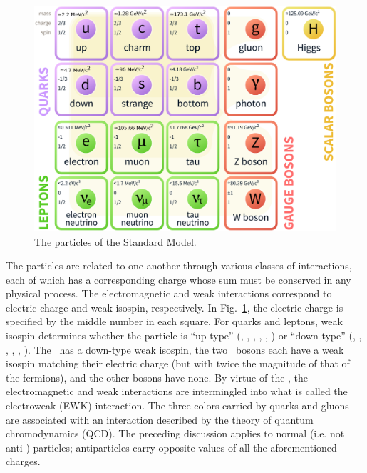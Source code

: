 \documentclass[oneside, letterpaper, 12pt, oldfontcommands]{memoir}
\begin{document}
\begin{figure}[hbtp]
  \begin{center}
    \includegraphics[width=1.0\textwidth]{Figures/sm_particles.png}
    \caption{
      The particles of the Standard Model.
    }
    \label{fig:sm_particles}
  \end{center}
\end{figure}

The particles are related to one another through various
classes of interactions, each of which has a corresponding charge whose sum must be conserved in any physical process.
The electromagnetic and weak interactions correspond to electric charge and weak isospin, respectively.
In Fig.~\ref{fig:sm_particles}, the electric charge is specified by the middle number in each square.
For quarks and leptons, weak isospin determines whether the particle is ``up-type''
(\Pu, \Pd, \Pt, \Pne, \Pnmu, \Pntau) or ``down-type'' (\Pd, \Ps, \Pb, \Pe, \Pmu, \Ptau).
The \PH\ has a down-type weak isospin, the two \PW\ bosons each have a weak isospin matching their electric charge
(but with twice the magnitude of that of the fermions), and the other bosons have none.
By virtue of the \PH, the electromagnetic and weak interactions are intermingled into what
is called the electroweak (EWK) interaction.
The three colors carried by quarks and gluons are associated with an interaction described by the theory of quantum
chromodynamics (QCD). The preceding discussion applies to normal (i.e. not anti-) particles; antiparticles carry opposite values of all the
aforementioned charges.
\end{document}
